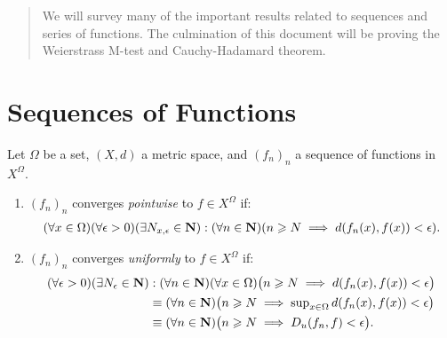 \documentclass[12pt,twoside,openany]{memoir}
\begin{document}

\begin{abstract}
    We will survey many of the important results related to sequences and series of functions. The culmination of this document will be proving the Weierstrass M-test and Cauchy-Hadamard theorem.
\end{abstract}

\section*{Sequences of Functions}
    \begin{definition}
        Let $\Omega$ be a set, $(X,d)$ a metric space, and $(f_n)_n$ a sequence of functions in $X^\Omega$.
        \begin{enumerate}[label = (\arabic*),itemsep=-7pt,topsep=3pt]
            \item $(f_n)_n$ converges \textit{pointwise} to $f \in X^\Omega$ if:
                \begin{equation*}
                \begin{split}
                    (\forall x \in \Omega)(\forall \epsilon > 0)(\exists N_{x,\epsilon} \in \mathbf{N}) : (\forall n \in \mathbf{N})( n \geqslant N \implies d(f_n(x), f(x)) < \epsilon).
                \end{split}
                \end{equation*}
            \item $(f_n)_n$ converges \textit{uniformly} to $f \in X^\Omega$ if:
                \begin{equation*}
                \begin{split}
                        (\forall \epsilon > 0)(\exists N_\epsilon \in \mathbf{N}) &: (\forall n \in \mathbf{N})(\forall x \in \Omega)\bigl(n \geqslant N \implies d(f_n(x), f(x)) < \epsilon\bigr) \\
                        &\equiv (\forall n \in \mathbf{N})\bigl(n \geqslant N \implies {\textstyle\sup_{x \in \Omega}d(f_n(x),f(x))} < \epsilon\bigr) \\
                        &\equiv (\forall n \in \mathbf{N})\bigl(n \geqslant N \implies D_u(f_n ,f) < \epsilon\bigr).
                \end{split}
                \end{equation*}
        \end{enumerate}
    \end{definition}
\end{document}
